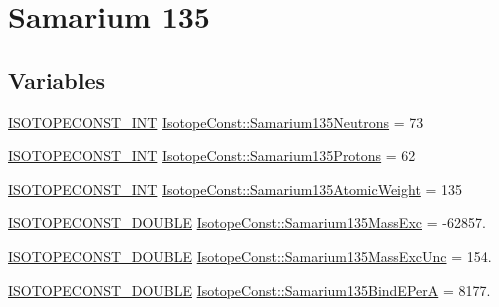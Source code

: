 \hypertarget{group___isotope_const-_samarium-_sm135}{}\section{Samarium 135}
\label{group___isotope_const-_samarium-_sm135}
\subsection*{Variables}
\begin{DoxyCompactItemize}
\item 
\mbox{\hyperlink{group___isotope_const-_macros_ga5f18360b3e99483a35c32d789e62621c}{I\+S\+O\+T\+O\+P\+E\+C\+O\+N\+S\+T\+\_\+\+I\+NT}} \mbox{\hyperlink{group___isotope_const-_samarium-_sm135_ga9653c73208477b05ae07beddb37fcee4}{Isotope\+Const\+::\+Samarium135\+Neutrons}} = 73
\item 
\mbox{\hyperlink{group___isotope_const-_macros_ga5f18360b3e99483a35c32d789e62621c}{I\+S\+O\+T\+O\+P\+E\+C\+O\+N\+S\+T\+\_\+\+I\+NT}} \mbox{\hyperlink{group___isotope_const-_samarium-_sm135_gae26f7a08bab118360524c03e06731290}{Isotope\+Const\+::\+Samarium135\+Protons}} = 62
\item 
\mbox{\hyperlink{group___isotope_const-_macros_ga5f18360b3e99483a35c32d789e62621c}{I\+S\+O\+T\+O\+P\+E\+C\+O\+N\+S\+T\+\_\+\+I\+NT}} \mbox{\hyperlink{group___isotope_const-_samarium-_sm135_ga8e63eba01064169af54d27a79b3b682c}{Isotope\+Const\+::\+Samarium135\+Atomic\+Weight}} = 135
\item 
\mbox{\hyperlink{group___isotope_const-_macros_ga8f45a7272ce02c0b4c65c44636ed719a}{I\+S\+O\+T\+O\+P\+E\+C\+O\+N\+S\+T\+\_\+\+D\+O\+U\+B\+LE}} \mbox{\hyperlink{group___isotope_const-_samarium-_sm135_gad7168987f5d779c0209cc9bbc9bd40ca}{Isotope\+Const\+::\+Samarium135\+Mass\+Exc}} = -\/62857.
\item 
\mbox{\hyperlink{group___isotope_const-_macros_ga8f45a7272ce02c0b4c65c44636ed719a}{I\+S\+O\+T\+O\+P\+E\+C\+O\+N\+S\+T\+\_\+\+D\+O\+U\+B\+LE}} \mbox{\hyperlink{group___isotope_const-_samarium-_sm135_gabf9c09e6d0c9be968453e156c7b39833}{Isotope\+Const\+::\+Samarium135\+Mass\+Exc\+Unc}} = 154.
\item 
\mbox{\hyperlink{group___isotope_const-_macros_ga8f45a7272ce02c0b4c65c44636ed719a}{I\+S\+O\+T\+O\+P\+E\+C\+O\+N\+S\+T\+\_\+\+D\+O\+U\+B\+LE}} \mbox{\hyperlink{group___isotope_const-_samarium-_sm135_ga8caf6524f40d4259cb5bb04f8f633df8}{Isotope\+Const\+::\+Samarium135\+Bind\+E\+PerA}} = 8177.
\item 

\end{DoxyCompactItemize}
